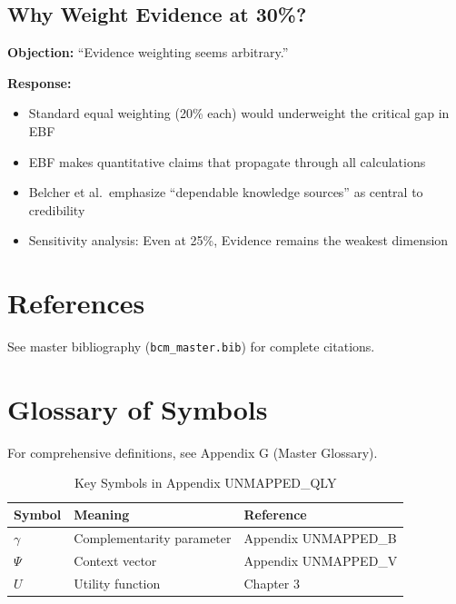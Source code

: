 \documentclass[11pt,a4paper]{article}
\begin{document}
\subsection{Why Weight Evidence at 30\%?}

\textbf{Objection:} ``Evidence weighting seems arbitrary.''

\textbf{Response:}
\begin{itemize}
    \item Standard equal weighting (20\% each) would underweight the critical gap in EBF
    \item EBF makes quantitative claims that propagate through all calculations
    \item Belcher et al.\ emphasize ``dependable knowledge sources'' as central to credibility
    \item Sensitivity analysis: Even at 25\%, Evidence remains the weakest dimension
\end{itemize}



\section{References}
\label{sec:references}

See master bibliography (\texttt{bcm\_master.bib}) for complete citations.

\nocite{bcm_master}


\section{Glossary of Symbols}
\label{sec:qly-glossary}

For comprehensive definitions, see Appendix G (Master Glossary).

\begin{table}[htbp]
\centering
\caption{Key Symbols in Appendix UNMAPPED_QLY}
\begin{tabular}{lll}
\toprule
\textbf{Symbol} & \textbf{Meaning} & \textbf{Reference} \\
\midrule
$\gamma$ & Complementarity parameter & Appendix UNMAPPED_B \\
$\Psi$ & Context vector & Appendix UNMAPPED_V \\
$U$ & Utility function & Chapter 3 \\
\bottomrule
\end{tabular}
\end{table}
\end{document}
